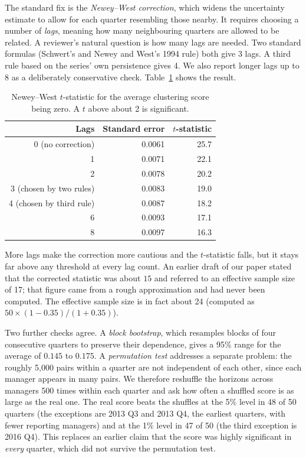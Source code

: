 The standard fix is the \emph{Newey--West correction}, which widens the uncertainty estimate to allow for each quarter resembling those nearby. It requires choosing a number of \emph{lags}, meaning how many neighbouring quarters are allowed to be related. A reviewer's natural question is how many lags are needed. Two standard formulas (Schwert's and Newey and West's 1994 rule) both give 3 lags. A third rule based on the series' own persistence gives 4. We also report longer lags up to 8 as a deliberately conservative check. Table~\ref{tab:lags} shows the result.

\begin{table}[htbp]
\centering
\caption{Newey--West $t$-statistic for the average clustering score being zero. A $t$ above about 2 is significant.}
\label{tab:lags}
\begin{tabular}{rrr}
\toprule
Lags & Standard error & $t$-statistic\\
\midrule
0 (no correction) & 0.0061 & 25.7\\
1 & 0.0071 & 22.1\\
2 & 0.0078 & 20.2\\
3 (chosen by two rules) & 0.0083 & 19.0\\
4 (chosen by third rule) & 0.0087 & 18.2\\
6 & 0.0093 & 17.1\\
8 & 0.0097 & 16.3\\
\bottomrule
\end{tabular}
\end{table}

More lags make the correction more cautious and the $t$-statistic falls, but it stays far above any threshold at every lag count. An earlier draft of our paper stated that the corrected statistic was about $15$ and referred to an effective sample size of 17; that figure came from a rough approximation and had never been computed. The effective sample size is in fact about 24 (computed as $50\times(1-0.35)/(1+0.35)$).

Two further checks agree. A \emph{block bootstrap}, which resamples blocks of four consecutive quarters to preserve their dependence, gives a 95\% range for the average of $0.145$ to $0.175$. A \emph{permutation test} addresses a separate problem: the roughly 5{,}000 pairs within a quarter are not independent of each other, since each manager appears in many pairs. We therefore reshuffle the horizons across managers 500 times within each quarter and ask how often a shuffled score is as large as the real one. The real score beats the shuffles at the 5\% level in 48 of 50 quarters (the exceptions are 2013 Q3 and 2013 Q4, the earliest quarters, with fewer reporting managers) and at the 1\% level in 47 of 50 (the third exception is 2016 Q4). This replaces an earlier claim that the score was highly significant in \emph{every} quarter, which did not survive the permutation test.


